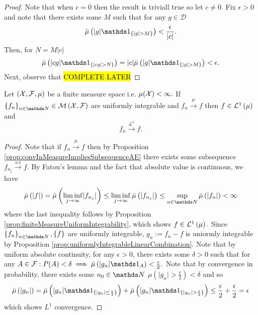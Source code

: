 \begin{proof}
Note that when $c=0$ then the result is triviall true so let $c\neq0.$
Fix $\epsilon>0$ and note that there exists some $M$ such that for
any $g\in\mathcal{D}$
\[
\lebInt{\mu}{\lvert g\rvert\indicate_{\{\lvert g\rvert>M\}}}<\frac{\epsilon}{\lvert c\rvert}.
\]
Then, for $N=M\lvert c\rvert$
\[
\lebInt{\mu}{\lvert cg\rvert\indicate_{\{\lvert cg\rvert>N\}}}=\lvert c\rvert\lebInt{\mu}{\lvert g\rvert\indicate_{\{\lvert g\rvert>M\}}}<\epsilon.
\]
Next, observe that \hl{COMPLETE LATER}
\end{proof}
\begin{thm}
\label{thm:vitaliConvergence}Let $\left(\mathcal{X},\mathcal{F},\mu\right)$ be a
finite measure space i.e. $\mu(\mathcal{X})<\infty.$ If $\left\{ f_{n}\right\} _{n\in\N}\in\measurableFunctions$
are uniformly integrable and $f_{n}\stackrel{\mu}{\longrightarrow}f$
then $f\in\mathcal{L}^{1}\left(\mu\right)$ and 
\[
f_{n}\stackrel{\mathcal{L}^{1}}{\longrightarrow}f.
\]
\end{thm}

\begin{proof}
Note that if $f_{n}\stackrel{\mu}{\longrightarrow}f$ then by Proposition
\ref{prop:convInMeasureImpliesSubsequenceAE} there exists some subsequence
$f_{n_{j}}\stackrel{\text{a.e}}{\longrightarrow}f$. By Fatou's lemma
and the fact that absolute value is continuous, we have
\[
\lebInt{\mu}{\lvert f\rvert}=\lebInt{\mu}{\liminf_{j\to\infty}\lvert f_{n_{j}}\rvert}\leq\liminf_{j\to\infty}\lebInt{\mu}{\lvert f_{n_{j}}\rvert}\leq\sup_{n\in\N}\lebInt{\mu}{\lvert f_{n}\rvert}<\infty
\]
where the last inequality follows by Proposition \ref{prop:finiteMeasureUniformIntegrability},
which shows $f\in\mathcal{L}^{1}\left(\mu\right).$ Since $\left\{ f_{n}\right\} _{n\in\N},\left\{ f\right\} $
are uniformly integrable, $g_{n}:=f_{n}-f$ is uniormly integrable
by Proposition \ref{prop:uniformlyIntegrableLinearCombination}. Note
that by uniform absolute continuity, for any $\epsilon>0$, there
exists some $\delta>0$ such that for any $A\in\F:P(A)<\delta\implies\lebInt{\mu}{\lvert g_{n}\rvert\indicate_{A}}<\frac{\epsilon}{2}.$
Note that by convergence in probability, there exists some $n_{0}\in\N$
$\mu\left(\lvert g_{n}\rvert>\frac{\epsilon}{2}\right)<\delta$ and
so
\[
\lebInt{\mu}{\lvert g_{n}\rvert}=\lebInt{\mu}{\lvert g_{n}\rvert\indicate_{\{\lvert g_{n}\rvert\leq\frac{\epsilon}{2}\}}}+\lebInt{\mu}{\lvert g_{n}\rvert\indicate_{\{\lvert g_{n}\rvert>\frac{\epsilon}{2}\}}}\leq\frac{\epsilon}{2}+\frac{\epsilon}{2}=\epsilon
\]
which shows $L^{1}$ convergence.
\end{proof}

